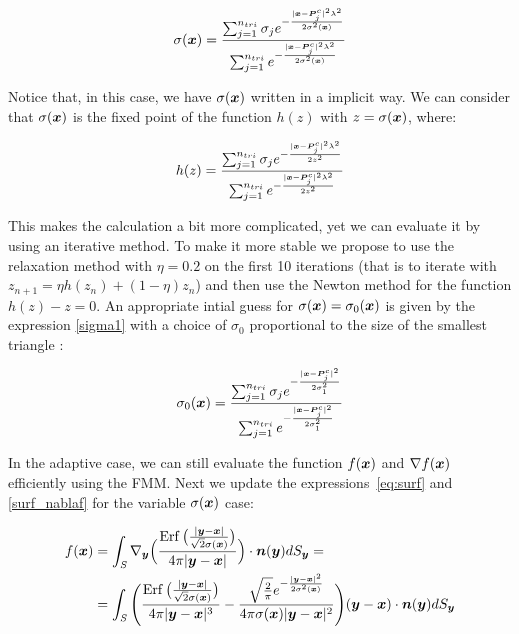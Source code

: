 \documentclass[11pt]{article}
\numberwithin{equation}{section}
\newcommand{\vct}{\vectorsym}
\DeclareMathOperator\erf{Erf}
\newcommand\bx{\vct{x}}
\newcommand\by{\vct{y}}
\newcommand\bn{\boldsymbol n}
\newcommand\bP{\boldsymbol P}
\begin{document}
\begin{equation}\label{sigma2}
\sigma(\bx)=\frac{\sum_{j=1}^{n_{tri}}\sigma_je^{-\frac{|\bx-\bP_j^c|^2 \lambda^2}{2\sigma^2(\bx)}}}{\sum_{j=1}^{n_{tri}}e^{-\frac{|\bx-\bP_j^c|^2 \lambda^2}{2\sigma^2(\bx)}}}
\end{equation}

Notice that, in this case, we have $\sigma(\bx)$ written in a implicit way. We can consider that $\sigma(\bx)$ is the fixed point of the function $h(z)$ with $z=\sigma(\bx)$, where:

\begin{equation}\label{sigma2}
h(z)=\frac{\sum_{j=1}^{n_{tri}}\sigma_je^{-\frac{|\bx-\bP_j^c|^2 \lambda^2}{2z^2}}}{\sum_{j=1}^{n_{tri}}e^{-\frac{|\bx-\bP_j^c|^2 \lambda^2}{2z^2}}}
\end{equation}

This makes the calculation a bit more complicated, yet we can evaluate it by using an iterative method. To make it more stable we propose to use the relaxation method with $\eta=0.2$ on the first 10 iterations (that is to iterate with $z_{n+1}=\eta h(z_n)+(1-\eta)z_n$) and then use the Newton method for the function $h(z)-z=0$. An appropriate intial guess for $\sigma(\bx)=\sigma_0(\bx)$ is given by the expression \ref{sigma1} with a choice of $\sigma_0$ proportional to the size of the smallest triangle :
 
\begin{equation}\label{sigma0}
\sigma_0(\bx)=\frac{\sum_{j=1}^{n_{tri}}\sigma_je^{- \frac{|\bx-\bP_j^c|^2}{2\sigma^2_1}}}{\sum_{j=1}^{n_{tri}}e^{-\frac{|\bx-\bP_j^c|^2}{2\sigma^2_1}}}
\end{equation}









In the adaptive case, we can still evaluate the function $f(\bx)$ and
$\nabla f(\bx)$ efficiently using the FMM. Next we update the
expressions~\ref{eq:surf} and \ref{surf_nablaf} for the variable
$\sigma(\bx)$ case:

 
\begin{equation}
\begin{aligned}
f(\bx)&=\int_{\mathit{S}}\nabla_{\by}\Big(\frac{\erf\big(\frac{|\by-\bx|}{\sqrt{2}\sigma(\bx)}\big)}{4\pi|\by-\bx|}\Big)\cdot\bn(\by)dS_{\by}=\\
&=\int_{\mathit{S}}\Bigg(\frac{\erf\big(\frac{|\by-\bx|}{\sqrt{2}\sigma(\bx)}\big)}{4\pi|\by-\bx|^3}-\frac{\sqrt{\frac{2}{\pi}}e^{-\frac{|\by-\bx|^2}{2\sigma^2(\bx)}}}{4\pi\sigma(\bx)|\by-\bx|^2}\Bigg)(\by-\bx)\cdot\bn(\by)dS_{\by}
\end{aligned}
\end{equation}
\end{document}
